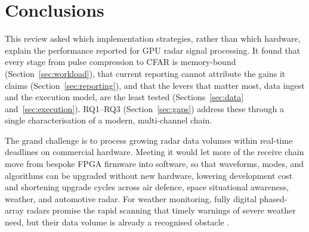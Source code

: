 \section{Conclusions}
\label{sec:conclusion}
This review asked which implementation strategies, rather than which hardware,
explain the performance reported for GPU radar signal processing.
It found that every stage from pulse compression to CFAR is memory-bound (Section~\ref{sec:workload}),
that current reporting cannot attribute the gains it claims (Section~\ref{sec:reporting}),
and that the levers that matter most, data ingest and the execution model, are the least tested
(Sections~\ref{sec:data} and~\ref{sec:execution}).
RQ1--RQ3 (Section~\ref{sec:gaps}) address these through a single characterisation of a modern, multi-channel chain.

The grand challenge is to process growing radar data volumes within real-time deadlines on commercial hardware. Meeting it would let more of the receive chain move from bespoke FPGA firmware into software, so that waveforms, modes, and algorithms can be upgraded without new hardware, lowering development cost and shortening upgrade cycles across air defence, space situational awareness, weather, and automotive radar. For weather monitoring, fully digital phased-array radars promise the rapid scanning that timely warnings of severe weather need,
but their data volume is already a recognised obstacle \cite{uekiDataChallengeFully2025}.